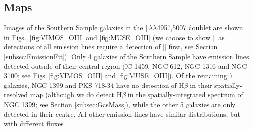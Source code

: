 	\subsection{Maps}
		\label{subsec:GasMaps}
		Images of the Southern Sample galaxies in the []$\lambda\lambda$4957,5007 doublet are shown in Figs.\ \ref{fig:VIMOS_OIII} and \ref{fig:MUSE_OIII} (we choose to show [] as detections of all emission lines require a detection of [] first, see Section \ref{subsec:EmissionFit}). Only 4 galaxies of the Southern Sample have emission lines detected outside of their central region (IC 1459, NGC 612, NGC 1316 and NGC 3100; see Figs.\,\ref{fig:VIMOS_OIII} and \ref{fig:MUSE_OIII}). Of the remaining 7 galaxies, NGC 1399 and PKS 718-34 have no detection of H$\beta$ in their spatially-resolved map (although we do detect H$\beta$ in the spatially-integrated spectrum of NGC 1399; see Section \ref{subsec:GasMass}), while the other 5 galaxies are only detected in their centre. All other emission lines have similar distributions, but with different fluxes.

